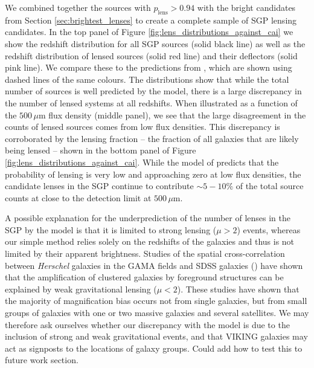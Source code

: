 We combined together the sources with $p_{\textrm{lens}} > 0.94$ with the bright candidates from Section \ref{sec:brightest_lenses} to create a complete sample of SGP lensing candidates. In the top panel of Figure \ref{fig:lens_distributions_against_cai} we show the redshift distribution for all SGP sources (solid black line) as well as the redshift distribution of lensed sources (solid red line) and their deflectors (solid pink line). We compare these to the predictions from \citealt{Cai_2013}, which are shown using dashed lines of the same colours. The distributions show that while the total number of sources is well predicted by the model, there is a large discrepancy in the number of lensed systems at all redshifts. When illustrated as a function of the $500\,\mu$m flux density (middle panel), we see that the large disagreement in the counts of lensed sources comes from low flux densities. This discrepancy is corroborated by the lensing fraction -- the fraction of all galaxies that are likely being lensed -- shown in the bottom panel of Figure \ref{fig:lens_distributions_against_cai}. While the model of \citealt{Cai_2013} predicts that the probability of lensing is very low and approaching zero at low flux densities, the candidate lenses in the SGP continue to contribute $\sim 5 - 10\%$ of the total source counts at close to the detection limit at $500\,\mu$m.

A possible explanation for the underprediction of the number of lenses in the SGP by the \citealt{Cai_2013} model is that it is limited to strong lensing ($\mu > 2$) events, whereas our simple method relies solely on the redshifts of the galaxies and thus is not limited by their apparent brightness. Studies of the spatial cross-correlation between \textit{Herschel} galaxies in the GAMA fields and SDSS galaxies (\citealt{Gonzalez-Nuevo_2014, Gonzalez-Nuevo_2017}) have shown that the amplification of clustered galaxies by foreground structures can be explained by weak gravitational lensing ($\mu < 2$). These studies have shown that the majority of magnification bias occurs not from single galaxies, but from small groups of galaxies with one or two massive galaxies and several satellites. We may therefore ask ourselves whether our discrepancy with the \citealt{Cai_2013} model is due to the inclusion of strong and weak gravitational events, and that VIKING galaxies may act as signposts to the locations of galaxy groups. {\color{red}Could add how to test this to future work section.}

